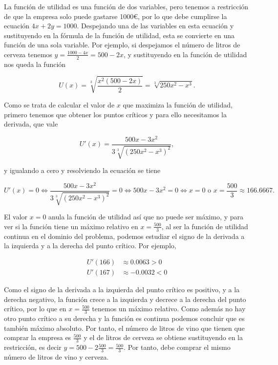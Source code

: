 \documentclass[
  spanish,
  a4paper,
]{scrreport}
\theoremstyle{definition}
\theoremstyle{remark}
\begin{document}
\begin{tcolorbox}[enhanced jigsaw, arc=.35mm, bottomrule=.15mm, bottomtitle=1mm, breakable, colback=white, colbacktitle=quarto-callout-tip-color!10!white, colframe=quarto-callout-tip-color-frame, coltitle=black, left=2mm, leftrule=.75mm, opacityback=0, opacitybacktitle=0.6, rightrule=.15mm, title=\textcolor{quarto-callout-tip-color}{\faLightbulb}\hspace{0.5em}{Solución}, titlerule=0mm, toprule=.15mm, toptitle=1mm]

La función de utilidad es una función de dos variables, pero tenemos a
restricción de que la empresa solo puede gastarse 1000€, por lo que debe
cumplirse la ecuación \(4x+2y = 1000\). Despejando una de las variables
en esta ecuación y sustituyendo en la fórmula de la función de utilidad,
esta se convierte en una función de una sola variable. Por ejemplo, si
despejamos el número de litros de cerveza tenemos
\(y=\frac{1000-4x}{2} = 500-2x\), y sustituyendo en la función de
utilidad nos queda la función

\[
U(x) = \sqrt[3]{\frac{x^2(500-2x)}{2}} = \sqrt[3]{250x^2-x^3}.
\]

Como se trata de calcular el valor de \(x\) que maximiza la función de
utilidad, primero tenemos que obtener los puntos críticos y para ello
necesitamos la derivada, que vale

\[
U'(x) = \frac{500x-3x^2}{3\sqrt[3]{(250x^2-x^3)^2}},
\]

y igualando a cero y resolviendo la ecuación se tiene

\[
U'(x) = 0 
\Leftrightarrow \frac{500x-3x^2}{3\sqrt[3]{(250x^2-x^3)^2}} = 0
\Leftrightarrow 500x-3x^2 = 0
\Leftrightarrow x=0 \mbox{ o } x=\frac{500}{3}\approx 166.6667. 
\]

El valor \(x=0\) anula la función de utilidad así que no puede ser
máximo, y para ver si la función tiene un máximo relativo en
\(x=\frac{500}{3}\), al ser la función de utilidad continua en el
dominio del problema, podemos estudiar el signo de la derivada a la
izquierda y a la derecha del punto crítico. Por ejemplo,

\begin{align*}
U'(166) &\approx 0.0063 >0\\
U'(167) &\approx -0.0032 <0
\end{align*}

Como el signo de la derivada a la izquierda del punto crítico es
positivo, y a la derecha negativo, la función crece a la izquierda y
decrece a la derecha del punto crítico, por lo que en
\(x=\frac{500}{3}\) tenemos un máximo relativo. Como además no hay otro
punto crítico a su derecha y la función es continua podemos concluir que
es también máximo absoluto. Por tanto, el número de litros de vino que
tienen que comprar la empresa es \(\frac{500}{3}\) y el de litros de
cerveza se obtiene sustituyendo en la restricción, es decir
\(y=500-2\frac{500}{3} = \frac{500}{3}\). Por tanto, debe comprar el
mismo número de litros de vino y cerveza.

\end{tcolorbox}
\end{document}
